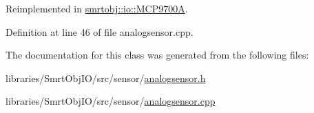 Reimplemented in \hyperlink{classsmrtobj_1_1io_1_1_m_c_p9700_a_ae50f36dae107dc570ad98646ba684a20}{smrtobj\+::io\+::\+M\+C\+P9700\+A}.



Definition at line 46 of file analogsensor.\+cpp.



The documentation for this class was generated from the following files\+:\begin{DoxyCompactItemize}
\item 
libraries/\+Smrt\+Obj\+I\+O/src/sensor/\hyperlink{analogsensor_8h}{analogsensor.\+h}\item 
libraries/\+Smrt\+Obj\+I\+O/src/sensor/\hyperlink{analogsensor_8cpp}{analogsensor.\+cpp}\end{DoxyCompactItemize}

